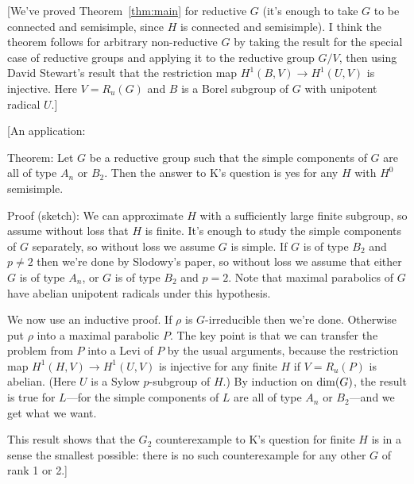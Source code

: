\documentclass[12pt]{amsart}
\newcommand\ra{\rightarrow}
\numberwithin{equation}{section}
\theoremstyle{definition}
\theoremstyle{remark}
\theoremstyle{remark}
\begin{document}
[We've proved Theorem~\ref{thm:main} for reductive $G$ (it's enough to take $G$ to be connected and semisimple, since $H$ is connected and semisimple).  I think the theorem follows for arbitrary non-reductive $G$ by taking the result for the special case of reductive groups and applying it to the reductive group $G/V$, then using David Stewart's result that the restriction map $H^1(B,V)\ra H^1(U,V)$ is injective.  Here $V= R_u(G)$ and $B$ is a Borel subgroup of $G$ with unipotent radical $U$.]

[An application:

Theorem: Let $G$ be a reductive group such that the simple components of $G$ are all of type $A_n$ or $B_2$.  Then the answer to K's question is yes for any $H$ with $H^0$ semisimple.

Proof (sketch): We can approximate $H$ with a sufficiently large finite subgroup, so assume without loss that $H$ is finite.  It's enough to study the simple components of $G$ separately, so without loss we assume $G$ is simple.  If $G$ is of type $B_2$ and $p\neq 2$ then we're done by Slodowy's paper, so without loss we assume that either $G$ is of type $A_n$, or $G$ is of type $B_2$ and $p= 2$.  Note that maximal parabolics of $G$ have abelian unipotent radicals under this hypothesis.

We now use an inductive proof.  If $\rho$ is $G$-irreducible then we're done.  Otherwise put $\rho$ into a maximal parabolic $P$.  The key point is that we can transfer the problem from $P$ into a Levi of $P$ by the usual arguments, because the restriction map $H^1(H,V)\ra H^1(U,V)$ is injective for any finite $H$ if $V= R_u(P)$ is abelian.  (Here $U$ is a Sylow $p$-subgroup of $H$.)  By induction on ${\rm dim}(G)$, the result is true for $L$---for the simple components of $L$ are all of type $A_n$ or $B_2$---and we get what we want.

This result shows that the $G_2$ counterexample to K's question for finite $H$ is in a sense the smallest possible: there is no such counterexample for any other $G$ of rank 1 or 2.]
\end{document}
